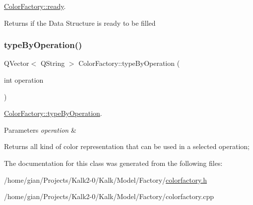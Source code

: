 \hyperlink{class_color_factory_a998d381b54b7b74ca24a99593030a452}{Color\+Factory\+::ready}. 

\begin{DoxyReturn}{Returns}
if the Data Structure is ready to be filled 
\end{DoxyReturn}
\mbox{\label{class_color_factory_a460165d3cd7b710b4f8731a5e56d8c35}} 
\subsubsection{\texorpdfstring{type\+By\+Operation()}{typeByOperation()}}
{\footnotesize\ttfamily Q\+Vector$<$ Q\+String $>$ Color\+Factory\+::type\+By\+Operation (\begin{DoxyParamCaption}\item[{int}]{operation }\end{DoxyParamCaption})\hspace{0.3cm}{\ttfamily [static]}}



\hyperlink{class_color_factory_a460165d3cd7b710b4f8731a5e56d8c35}{Color\+Factory\+::type\+By\+Operation}. 


\begin{DoxyParams}{Parameters}
{\em operation} & \\
\hline
\end{DoxyParams}
\begin{DoxyReturn}{Returns}
all kind of color representation that can be used in a selected operation; 
\end{DoxyReturn}


The documentation for this class was generated from the following files\+:\begin{DoxyCompactItemize}
\item 
/home/gian/\+Projects/\+Kalk2-\/0/\+Kalk/\+Model/\+Factory/\hyperlink{colorfactory_8h}{colorfactory.\+h}\item 
/home/gian/\+Projects/\+Kalk2-\/0/\+Kalk/\+Model/\+Factory/colorfactory.\+cpp\end{DoxyCompactItemize}
